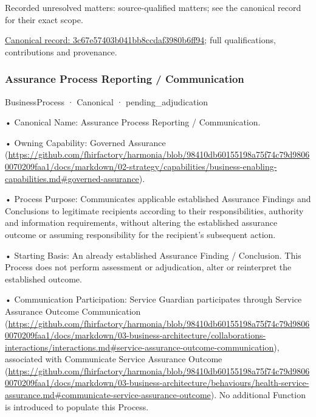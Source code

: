 {\small Recorded unresolved matters: source-qualified matters; see the canonical record for their exact scope.}\par
{\footnotesize \href{../../../../continuum/business/business-process/3c67e57403b041bb8ccdaf3980b6ff94.md}{Canonical record: 3c67e57403b041bb8ccdaf3980b6ff94}; full qualifications, contributions and provenance.}\par
\subsubsection{Assurance Process Reporting / Communication}

\label{element:2fc0b626577b43feb050bcd91ac2b0a9}
{\small BusinessProcess · Canonical · pending\_adjudication}\par

•
Canonical Name: Assurance Process Reporting / Communication.



•
Owning Capability: Governed Assurance (\url{https://github.com/fhirfactory/harmonia/blob/98410db60155198a75f74c79d98060070209faa1/docs/markdown/02-strategy/capabilities/business-enabling-capabilities.md#governed-assurance}).



•
Process Purpose: Communicates applicable established Assurance Findings and Conclusions to legitimate recipients according to their responsibilities, authority and information requirements, without altering the established assurance outcome or assuming responsibility for the recipient's subsequent action.



•
Starting Basis: An already established Assurance Finding / Conclusion. This Process does not perform assessment or adjudication, alter or reinterpret the established outcome.



•
Communication Participation: Service Guardian participates through Service Assurance Outcome Communication (\url{https://github.com/fhirfactory/harmonia/blob/98410db60155198a75f74c79d98060070209faa1/docs/markdown/03-business-architecture/collaborations-interactions/interactions.md#service-assurance-outcome-communication}), associated with Communicate Service Assurance Outcome (\url{https://github.com/fhirfactory/harmonia/blob/98410db60155198a75f74c79d98060070209faa1/docs/markdown/03-business-architecture/behaviours/health-service-assurance.md#communicate-service-assurance-outcome}). No additional Function is introduced to populate this Process.



